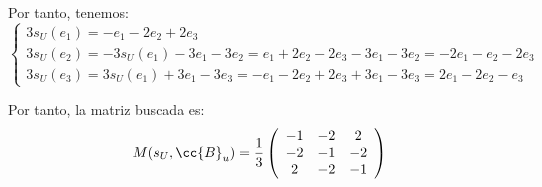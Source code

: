 \documentclass[12pt]{article}
\begin{document}
\begin{ejercicio}
\begin{enumerate}
        Por tanto, tenemos:
        \begin{equation*}
            \left\{\begin{array}{l}
                3s_U(e_1) = -e_1-2e_2+2e_3 \\
                3s_U(e_2) = -3s_U(e_1)-3e_1-3e_2 = e_1+2e_2-2e_3 -3e_1-3e_2 = -2e_1-e_2-2e_3\\
                3s_U(e_3) = 3s_U(e_1)+3e_1-3e_3 = -e_1-2e_2+2e_3+3e_1-3e_3 = 2e_1-2e_2-e_3
            \end{array}\right.
        \end{equation*}

        Por tanto, la matriz buscada es:
        \begin{equation*}
            M(s_U, \cc{B}_u) = \frac{1}{3}\left(\begin{array}{ccc}
                -1 & -2 & 2 \\
                -2 & -1 & -2\\
                2 & -2 & -1
            \end{array}\right)
        \end{equation*}
    \end{enumerate}
\end{ejercicio}
\end{document}
